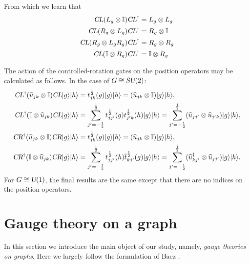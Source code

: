 \documentclass[12pt]{amsart}
\def\su2{\textsl{SU}(2)}
\def\uone{\textsl{U}(1)}
\def\CL{\textsl{CL}}
\def\CR{\textsl{CR}}
\theoremstyle{definition}
\theoremstyle{remark}
\numberwithin{equation}{section}
\begin{document}
From which we learn that
\begin{equation}
	\begin{split}
	\CL(L_g\otimes \mathbb{I}) \CL^\dag &= L_g \otimes L_g \\ 
	\CL(R_g\otimes L_g) \CL^\dag &= R_g\otimes \mathbb{I}\\
	\CL  (R_{g}\otimes L_g R_g)\CL^\dag &= R_g \otimes R_g \\
	\CL  (\mathbb{I}\otimes R_g )\CL^\dag &= \mathbb{I} \otimes R_g \\
	\end{split}
\end{equation}


The action of the controlled-rotation gates on the position operators may be calculated as follows.
In the case of $G\cong \su2$:
\begin{equation}
	\begin{split}
		\CL^\dag ( \widehat{u}_{jk}\otimes \mathbb{I} )\CL|g\rangle|h\rangle &= t_{jk}^{\frac12}(g)|g\rangle |h\rangle = ( \widehat{u}_{jk}\otimes \mathbb{I} )|g\rangle|h\rangle, \\
		\CL^\dag ( \mathbb{I}\otimes \widehat{u}_{jk}  )\CL|g\rangle|h\rangle &= \sum_{j'=-\frac12}^{\frac12}t_{jj'}^{\frac12}(g)t_{j'k}^{\frac12}(h)|g\rangle |h\rangle = \sum_{j'=-\frac12}^{\frac12}( \widehat{u}_{jj'}\otimes \widehat{u}_{j'k} )|g\rangle|h\rangle, \\
		\CR^\dag ( \widehat{u}_{jk}\otimes \mathbb{I} )\CR|g\rangle|h\rangle &= t_{jk}^{\frac12}(g)|g\rangle |h\rangle = ( \widehat{u}_{jk}\otimes \mathbb{I} )|g\rangle|h\rangle, \\
		\CR^\dag ( \mathbb{I}\otimes \widehat{u}_{jk}  )\CR|g\rangle|h\rangle &= \sum_{j'=-\frac12}^{\frac12}t_{jj'}^{\frac12}(h)\overline{t}_{kj'}^{\frac12}(g)|g\rangle |h\rangle = \sum_{j'=-\frac12}^{\frac12}( \widehat{u}_{kj'}^\dag\otimes \widehat{u}_{jj'} )|g\rangle|h\rangle. \\
	\end{split}
\end{equation}
For $G\cong \uone$, the final results are the same except that there are no 
indices on the position operators.

\section{Gauge theory on a graph}
In this section we introduce the main object of our study, namely, \emph{gauge theories on graphs}. Here we largely follow the formulation of Baez \cite{baez:1996a}.
\end{document}
